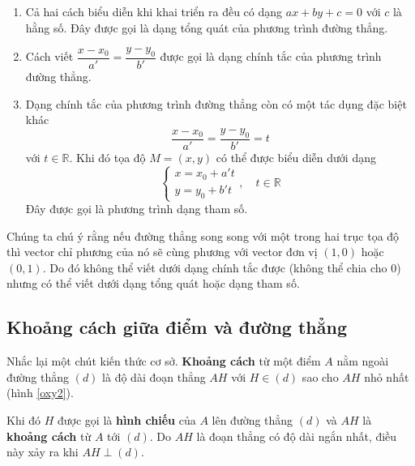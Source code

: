 \begin{enumerate}
	\item Cả hai cách biểu diễn khi khai triển ra đều có dạng $a x + by + c = 0$ với $c$ là hằng số. Đây được gọi là dạng tổng quát của phương trình đường thẳng. 
	
	\item Cách viết $\dfrac{x - x_0}{a'} = \dfrac{y - y_0}{b'}$ được gọi là dạng chính tắc của phương trình đường thẳng.
	
	\item Dạng chính tắc của phương trình đường thẳng còn có một tác dụng đặc biệt khác \[\frac{x - x_0}{a'} = \frac{y - y_0}{b'} = t\] với $t \in \mathbb{R}$. Khi đó tọa độ $M = (x, y)$ có thể được biểu diễn dưới dạng
	\begin{equation}
		\begin{cases}
			x = x_0 + a' t \\ y = y_0 + b' t
		\end{cases}, \quad t \in \mathbb{R}
	\end{equation}
	Đây được gọi là phương trình dạng tham số.
\end{enumerate}

Chúng ta chú ý rằng nếu đường thẳng song song với một trong hai trục tọa độ thì vector chỉ phương của nó sẽ cùng phương với vector đơn vị $(1, 0)$ hoặc $(0, 1)$. Do đó không thể viết dưới dạng chính tắc được (không thể chia cho 0) nhưng có thể viết dưới dạng tổng quát hoặc dạng tham số.

\subsection*{Khoảng cách giữa điểm và đường thẳng}

Nhắc lại một chút kiến thức cơ sở. \textbf{Khoảng cách} từ một điểm $A$ nằm ngoài đường thẳng $(d)$ là độ dài đoạn thẳng $AH$ với $H \in (d)$ sao cho $AH$ nhỏ nhất (hình \ref{oxy2}).

Khi đó $H$ được gọi là \textbf{hình chiếu} của $A$ lên đường thẳng $(d)$ và $AH$ là \textbf{khoảng cách} từ $A$ tới $(d)$. Do $AH$ là đoạn thẳng có độ dài ngắn nhất, điều này xảy ra khi $AH \perp (d)$.

